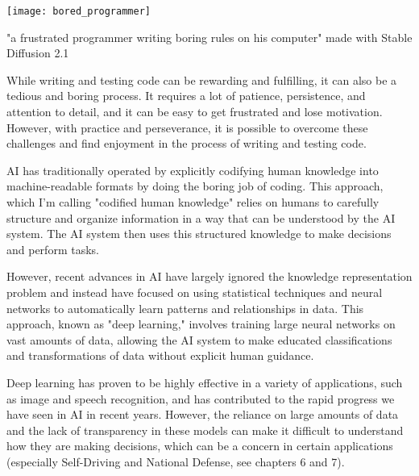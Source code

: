 \begin{pdf}
\begin{marginfigure}[-5.5cm]
        \texttt{[image: bored\_programmer]}
        \caption{"a frustrated programmer writing boring rules on his computer" made with Stable Diffusion 2.1}
\end{marginfigure}
\end{pdf}

While writing and testing code can be rewarding and fulfilling, it can also be a tedious and boring process. It requires a lot of patience, persistence, and attention to detail, and it can be easy to get frustrated and lose motivation. However, with practice and perseverance, it is possible to overcome these challenges and find enjoyment in the process of writing and testing code.

AI has traditionally operated by explicitly codifying human knowledge into machine-readable formats by doing the boring job of coding. This approach, which I’m calling "codified human knowledge" relies on humans to carefully structure and organize information in a way that can be understood by the AI system. The AI system then uses this structured knowledge to make decisions and perform tasks.

However, recent advances in AI have largely ignored the knowledge representation problem and instead have focused on using statistical techniques and neural networks to automatically learn patterns and relationships in data. This approach, known as "deep learning," involves training large neural networks on vast amounts of data, allowing the AI system to make educated classifications and transformations of data without explicit human guidance.

Deep learning has proven to be highly effective in a variety of applications, such as image and speech recognition, and has contributed to the rapid progress we have seen in AI in recent years. However, the reliance on large amounts of data and the lack of transparency in these models can make it difficult to understand how they are making decisions, which can be a concern in certain applications (especially Self-Driving and National Defense, see chapters 6 and 7).

